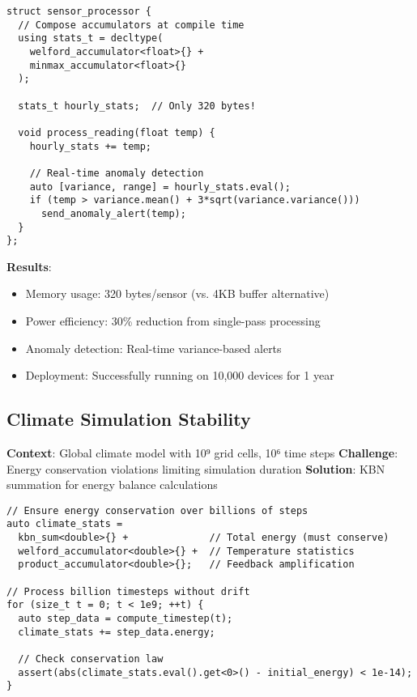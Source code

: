 \documentclass[sigconf]{acmart}
\begin{document}
\begin{lstlisting}[caption={IoT edge computing with memory constraints}]
struct sensor_processor {
  // Compose accumulators at compile time
  using stats_t = decltype(
    welford_accumulator<float>{} +
    minmax_accumulator<float>{}
  );

  stats_t hourly_stats;  // Only 320 bytes!

  void process_reading(float temp) {
    hourly_stats += temp;

    // Real-time anomaly detection
    auto [variance, range] = hourly_stats.eval();
    if (temp > variance.mean() + 3*sqrt(variance.variance()))
      send_anomaly_alert(temp);
  }
};
\end{lstlisting}

\textbf{Results}:
\begin{itemize}
\item Memory usage: 320 bytes/sensor (vs. 4KB buffer alternative)
\item Power efficiency: 30\% reduction from single-pass processing
\item Anomaly detection: Real-time variance-based alerts
\item Deployment: Successfully running on 10,000 devices for 1 year
\end{itemize}

\subsection{Climate Simulation Stability}

\textbf{Context}: Global climate model with 10⁹ grid cells, 10⁶ time steps
\textbf{Challenge}: Energy conservation violations limiting simulation duration
\textbf{Solution}: KBN summation for energy balance calculations

\begin{lstlisting}[caption={Climate simulation with energy conservation}]
// Ensure energy conservation over billions of steps
auto climate_stats =
  kbn_sum<double>{} +              // Total energy (must conserve)
  welford_accumulator<double>{} +  // Temperature statistics
  product_accumulator<double>{};   // Feedback amplification

// Process billion timesteps without drift
for (size_t t = 0; t < 1e9; ++t) {
  auto step_data = compute_timestep(t);
  climate_stats += step_data.energy;

  // Check conservation law
  assert(abs(climate_stats.eval().get<0>() - initial_energy) < 1e-14);
}
\end{lstlisting}
\end{document}
